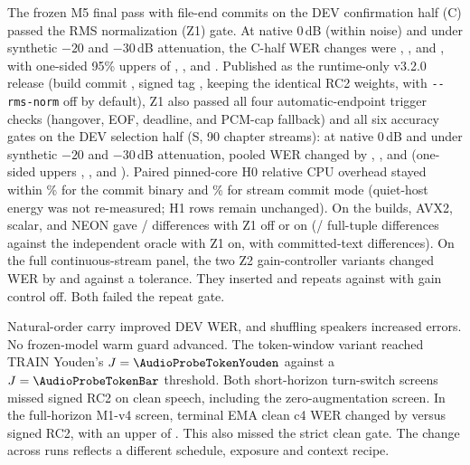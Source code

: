  The frozen M5 final pass with file-end commits on the
DEV confirmation half (C) passed the RMS normalization (Z1) gate. At native
0\,dB (within noise) and under synthetic $-20$ and $-30$\,dB attenuation, the
C-half WER changes were \AudioZOneCleanDelta\pp{},
\AudioZOneTwentyDelta\pp{}, and \AudioZOneThirtyDelta\pp{}, with one-sided
95\% uppers of \AudioZOneCleanUpper\pp{}, \AudioZOneTwentyUpper\pp{}, and
\AudioZOneThirtyUpper\pp{}. Published as the runtime-only v3.2.0 release
(build commit \VThreeTwoBuildCommit{}, signed tag \VThreeTwoTagObject{},
keeping the identical \ReleaseVer{} RC2 weights, with \texttt{-{}-rms-norm} off
by default), Z1 also passed all four automatic-endpoint trigger checks
(hangover, EOF, deadline, and PCM-cap fallback) and all six accuracy gates on
the DEV selection half (S, 90 chapter streams): at native 0\,dB and under
synthetic $-20$ and $-30$\,dB attenuation, pooled WER changed by
\AudioZOneAutoCleanDelta\pp{}, \AudioZOneAutoTwentyDelta\pp{}, and
\AudioZOneAutoThirtyDelta\pp{} (one-sided uppers \AudioZOneAutoCleanUpper{},
\AudioZOneAutoTwentyUpper{}, and \AudioZOneAutoThirtyUpper\pp{}). Paired
pinned-core H0 relative CPU overhead stayed within \AudioZOneCpuEngineUpper\%
for the commit binary and \AudioZOneCpuStreamUpper\% for stream commit mode
(quiet-host energy was not re-measured; \ReleaseVer{} H1 rows remain unchanged).
On the \AudioZOneCrossIsaCommit{} builds, AVX2, scalar, and NEON gave
\AudioZOneCrossIsaDiffs/\AudioZOneCrossIsaClips{} differences with Z1 off or on
(\AudioZOneOracleTupleDiffs/\AudioZOneCrossIsaClips{} full-tuple differences
against the independent oracle with Z1 on, with \AudioZOneCrossIsaDiffs{}
committed-text differences). On the full continuous-stream panel,
the two Z2 gain-controller variants changed WER by \AudioProbeAgcDelta\pp{}
and \AudioProbeAgcCalDelta\pp{} against a \AudioProbeAgcBar\pp{} tolerance.
They inserted \AudioProbeAgcRepeatOn{} and \AudioProbeAgcCalRepeat{} repeats
against \AudioProbeAgcRepeatOff{} with gain control off. Both failed the repeat gate.

 Natural-order carry improved DEV WER, and
shuffling speakers increased errors. No frozen-model warm guard advanced.
The token-window variant reached TRAIN Youden's \(J=\AudioProbeTokenYouden\)
against a \(J=\AudioProbeTokenBar\) threshold. Both short-horizon turn-switch
screens missed signed RC2 on clean speech, including the zero-augmentation
screen. In the full-horizon M1-v4 screen, terminal EMA clean c4 WER changed by
\AudioMOneFourDelta\pp{} versus signed RC2, with an upper of \AudioMOneFourUpper\pp{}.
This also missed the strict clean gate. The change across runs reflects a
different schedule, exposure and context recipe.

